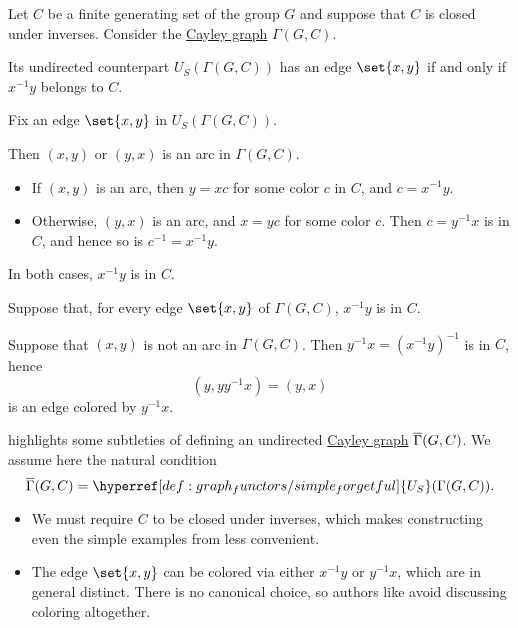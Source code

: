 \begin{proposition}\label{thm:undirected_cayley_graph}
  Let \( C \) be a finite generating set of the group \( G \) and suppose that \( C \) is closed under inverses. Consider the \hyperref[def:cayley_graph]{Cayley graph} \( \Gamma(G, C) \).

  Its undirected counterpart \hyperref[def:graph_functors/simple_forgetful]{\( U_S \)}\( (\Gamma(G, C)) \) has an edge \( \set{ x, y } \) if and only if \( x^{-1} y \) belongs to \( C \).
\end{proposition}
\begin{defproof}
  \SufficiencySubProof Fix an edge \( \set{ x, y } \) in \( U_S(\Gamma(G, C)) \).

  Then \( (x, y) \) or \( (y, x) \) is an arc in \( \Gamma(G, C) \).

  \begin{itemize}
    \item If \( (x, y) \) is an arc, then \( y = xc \) for some color \( c \) in \( C \), and \( c = x^{-1} y \).
    \item Otherwise, \( (y, x) \) is an arc, and \( x = yc \) for some color \( c \). Then \( c = y^{-1} x \) is in \( C \), and hence so is \( c^{-1} = x^{-1} y \).
  \end{itemize}

  In both cases, \( x^{-1} y \) is in \( C \).

  \NecessitySubProof Suppose that, for every edge \( \set{ x, y } \) of \( \Gamma(G, C) \), \( x^{-1} y \) is in \( C \).

  Suppose that \( (x, y) \) is not an arc in \( \Gamma(G, C) \). Then \( y^{-1} x = (x^{-1} y)^{-1} \) is in \( C \), hence
  \begin{equation*}
    (y, y y^{-1} x) = (y, x)
  \end{equation*}
  is an edge colored by \( y^{-1} x \).
\end{defproof}

\begin{remark}\label{rem:undirected_cayley_graph}
   highlights some subtleties of defining an undirected \hyperref[def:cayley_graph]{Cayley graph} \( \oline{\Gamma}(G, C) \). We assume here the natural condition
  \begin{equation*}
    \oline{\Gamma}(G, C) = \hyperref[def:graph_functors/simple_forgetful]{U_S}(\Gamma(G, C)).
  \end{equation*}

  \begin{itemize}
    \item We must require \( C \) to be closed under inverses, which makes constructing even the simple examples from  less convenient.

    \item The edge \( \set{ x, y } \) can be colored via either \( x^{-1} y \) or \( y^{-1} x \), which are in general distinct. There is no canonical choice, so authors like  avoid discussing coloring altogether.
  \end{itemize}
\end{remark}

